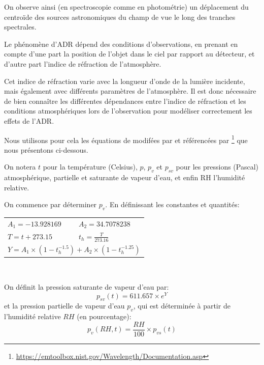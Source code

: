 \documentclass[../main/main.tex]{subfiles}
\begin{document}
On observe ainsi (en spectroscopie comme en photométrie) un déplacement du centroïde des
sources astronomiques du champ de vue le long des tranches spectrales.

Le phénomène d'ADR dépend des conditions d'observations, en prenant en
compte d'une part la position de l'objet dans le ciel par rapport au
détecteur, et d'autre part
l'indice de réfraction de l'atmosphère.

Cet indice de réfraction varie avec la longueur d'onde de la lumière
incidente, mais également avec différents paramètres de l'atmosphère. Il
est donc nécessaire de bien connaître les différentes dépendances entre
l'indice de réfraction et les conditions atmosphériques lors de
l'observation pour modéliser correctement les effets de l'ADR.

Nous utilisons pour cela les équations de \citet{Edlen1966} modifées
par \citet{Birch1993, Birch1994} et référencées par
\citet{Stone2001}\footnote{\url{https://emtoolbox.nist.gov/Wavelength/Documentation.asp}}
que nous présentons ci-dessous.

On notera $t$ pour la température (Celsius),
$p$, $p_{v}$ et $p_{sv}$ pour les pressions (Pascal) atmosphérique,
partielle et saturante de
vapeur d'eau, et enfin RH l'humidité relative.

On commence par déterminer $p_{v}$.
En définissant les constantes et quantités:

\begin{center}
  \renewcommand{\arraystretch}{1.5}
  \begin{tabular}{ll}
   
$A_1= -13.928169$ & $A_2 = 34.7078238$ \\
$T= t + 273.15$ & $t_h = \frac{T}{273.16}$ \\
  \multicolumn{2}{c}{$Y = A_1 \times(1 - t_h^{-1.5}) + A_2 \times (1 - t_h^{-1.25})$}
\end{tabular}\\
\end{center}

On définit la pression saturante de vapeur d'eau par:
\begin{equation}
  \label{eq:pvs}
    p_{sv}(t) = 611.657 \times e^{Y}
\end{equation}
et la pression partielle de vapeur d'eau $p_v$, qui est déterminée à partir de
l'humidité relative $RH$ (en pourcentage):
\begin{equation}
 \label{eq:pv}
    p_v(RH,t) = \frac{RH}{100}\times p_{vs}(t)
\end{equation}
\end{document}
